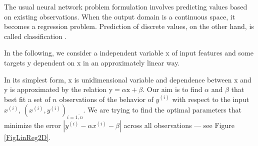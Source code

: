 \par The usual neural network problem formulation involves predicting values based on existing observations. When the output domain is a continuous space, it becomes a regression problem. Prediction of discrete values, on the other hand, is called classification \cite{D2l}.

\par In the following, we consider a independent variable $\mathrm{x}$ of input features and some targets $\mathrm{y}$ dependent on $\mathrm{x}$ in an approximately linear way. 
\par In its simplest form, $\mathrm{x}$ is unidimensional variable and dependence between $\mathrm{x}$ and $\mathrm{y}$ is approximated by the relation $\mathrm{y}=\alpha \mathrm{x} + \beta$. Our aim is to find $\alpha$ and $\beta$ that best fit a set of $n$ observations of the behavior of $y^(i)$ with respect to the input $x^(i)$, $(x^{(i)}, y^{(i)})_{i=\overline{1,n}}$. We are trying to find the optimal parameters that minimize the error $|y^{(i)}-\alpha x^{(i)} - \beta|$ across all observations --- see Figure \ref{FigLinReg2D}.

